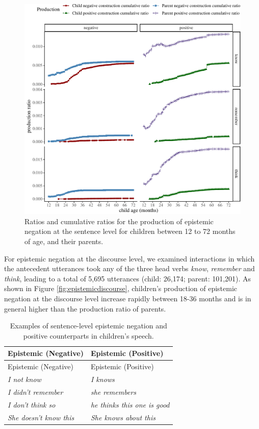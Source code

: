 \documentclass[
  english,
  man,floatsintext]{apa6}
\begin{document}
\begin{figure}[H]

{\centering \includegraphics{neg_construction_article_files/figure-latex/epistemic-1} 

}

\caption{Ratios and cumulative ratios for the production of epistemic negation at the sentence level for children between 12 to 72 months of age, and their parents.}\label{fig:epistemic}
\end{figure}

For epistemic negation at the discourse level, we examined interactions in which the antecedent utterances took any of the three head verbs \emph{know}, \emph{remember} and \emph{think}, leading to a total of 5,695 utterances (child: 26,174; parent: 101,201). As shown in Figure \ref{fig:epistemicdiscourse}, children's production of epistemic negation at the discourse level increase rapidly between 18-36 months and is in general higher than the production ratio of parents.

\begin{longtable}[]{@{}ll@{}}
\caption{\label{tab:epistem} Examples of sentence-level epistemic negation and positive counterparts in children's speech.}\tabularnewline
\toprule
Epistemic (Negative) & Epistemic (Positive) \\
\midrule
\endfirsthead
\toprule
Epistemic (Negative) & Epistemic (Positive) \\
\midrule
\endhead
\emph{I not know} & \emph{I knows} \\
\emph{I didn't remember} & \emph{she remembers} \\
\emph{I don't think so} & \emph{he thinks this one is good} \\
\emph{She doesn't know this} & \emph{She knows about this} \\
\bottomrule
\end{longtable}
\end{document}

